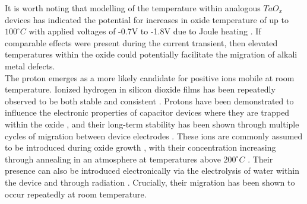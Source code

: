 \noindent It is worth noting that modelling of the temperature within analogous $TaO_x$  devices has indicated the potential for increases in oxide temperature of up to  $100^\circ C$ with applied voltages of -0.7V to -1.8V due to Joule heating \cite{shen2021experimentally}. If comparable effects were present during the current transient, then elevated temperatures within the oxide could potentially facilitate the migration of alkali metal defects.\\



\noindent The proton \cite{hofstein1967proton} emerges as a more likely candidate for positive ions mobile at room temperature. Ionized hydrogen in silicon dioxide films has been repeatedly observed to be both stable and consistent \cite{vanheusden1998chemical}. Protons have been demonstrated to influence the electronic properties of capacitor devices where they are trapped within the oxide \cite{vanheusden1999non}, and their long-term stability has been shown through multiple cycles of migration between device electrodes \cite{warren1997protonic}. These ions are commonly assumed to be introduced during oxide growth \cite{vanheusden1998thermally}, with their concentration increasing through annealing in an atmosphere at temperatures above $200^\circ C$ \cite{lifshitz1989detection}. Their presence can also be introduced electronically via the electrolysis of water within the device and through radiation \cite{winokur1977field}. Crucially, their migration has been shown to occur repeatedly at room temperature.\\

